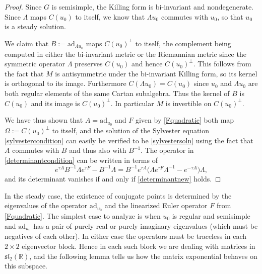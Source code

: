 \documentclass[oneside, 11pt]{amsart}
\numberwithin{equation}{section}
\newcommand{\ad}{\mathrm{ad}}
\newcommand{\subby}{\Omega}
\newcommand{\eulerop}{F}
\newcommand{\adop}{A}
\newcommand{\adlambop}{B}
\begin{document}
\begin{proof}
    Since $G$ is semisimple, the Killing form is bi-invariant and nondegenerate. 
    Since $\Lambda$ maps $C(u_0)$ to itself, we know that $\Lambda u_0$ commutes with $u_0$, so that $u_0$ is a steady solution.
    
    We claim that $\adlambop:=\ad_{\Lambda u_0}$ maps $C(u_0)^{\perp}$ to itself, the complement being computed in either the bi-invariant metric or the Riemannian metric since the symmetric operator $\Lambda$ preserves $C(u_0)$ and hence $C(u_0)^{\perp}$. This follows from the fact that $M$ is antisymmetric under the bi-invariant Killing form, so its kernel is orthogonal to its image. Furthermore $C(\Lambda u_0) = C(u_0)$ since $u_0$ and $\Lambda u_0$ are both regular elements of the same Cartan subalgebra. Thus the kernel of $\adlambop$ is $C(u_0)$ and its image is $C(u_0)^{\perp}$. In particular $M$ is invertible on $C(u_0)^{\perp}$. 

    We have thus shown that $\adop=\ad_{u_0}$ and $\eulerop$ given by \eqref{Fquadratic} both map $\subby:=C(u_0)^{\perp}$ to itself, and the solution of the Sylvester equation \eqref{sylvestercondition} can easily be verified to be \eqref{sylvestersoln}
    using the fact that $\adop$ commutes with $\adlambop$ and thus also with $\adlambop^{-1}$. The operator in \eqref{determinantcondition} can be written in terms of  
    $$ e^{\tau \adop} \adlambop^{-1}\Lambda e^{\tau \eulerop} - \adlambop^{-1} \Lambda = \adlambop^{-1} e^{\tau \adop}  \big( \Lambda e^{\tau \eulerop} \Lambda^{-1} - e^{-\tau \adop}\big)\Lambda,$$
    and its determinant vanishes if and only if \eqref{determinantnew} holds.
\end{proof}

 

In the steady case, the existence of conjugate points is determined by the eigenvalues of the operator $\ad_{u_0}$ and the linearized Euler 
operator $F$ from \eqref{Fquadratic}. 
The simplest case to analyze is when $u_0$ is regular and semisimple and $\ad_{u_0}$ has a pair of purely real or purely imaginary eigenvalues (which must be negatives of each other). In either case the operators must be traceless in each $2\times 2$ eigenvector block. Hence in each such block we are dealing with matrices in $\mathfrak{sl}_2(\mathbb{R})$, and the following lemma tells us how the matrix exponential behaves on this subspace.
 
\end{document}

